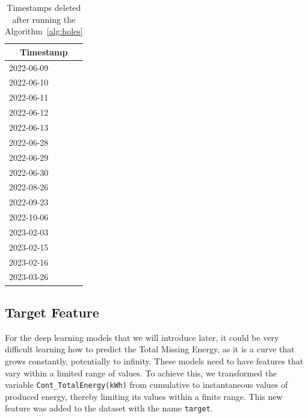 \begin{minipage}[t]{0.30\linewidth}
	\begin{table}[H]
		\centering
		\begin{tabular}[c]{l}
			\multicolumn{1}{c}{\textbf{Timestamp}} \\
			\hline
			2022-06-09                             \\
			2022-06-10                             \\
			2022-06-11                             \\
			2022-06-12                             \\
			2022-06-13                             \\
			2022-06-28                             \\
			2022-06-29                             \\
			2022-06-30                             \\
			2022-08-26                             \\
			2022-09-23                             \\
			2022-10-06                             \\
			2023-02-03                             \\
			2023-02-15                             \\
			2023-02-16                             \\
			2023-03-26                             \\
		\end{tabular}
		\caption{Timestamps deleted after running the Algorithm~\ref{alg:holes}}
	\end{table}
\end{minipage}

\subsection{Target Feature}
For the deep learning models that we will introduce later,
it could be very difficult learning how to predict the Total Missing Energy,
as it is a curve that grows constantly, potentially to infinity.
These models need to have features that vary within a limited range of
values. To achieve this, we transformed the variable
\verb|Cont_TotalEnergy(kWh)| from cumulative to instantaneous values of
produced energy, thereby limiting its values within a finite range.
This new feature was added to the dataset with the name \verb|target|.

